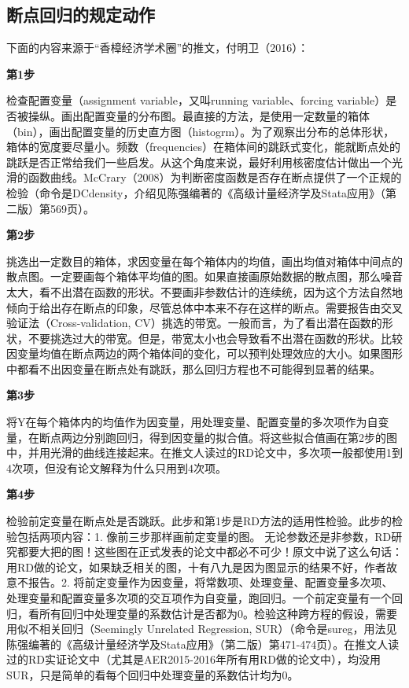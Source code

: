 \documentclass[cn,12pt,math=newtx,citestyle=gb7714-2015,bibstyle=gb7714-2015]{elegantbook}
\begin{document}
	\subsection{断点回归的规定动作}
	
	下面的内容来源于“香樟经济学术圈”的推文，付明卫（2016）：
	
	\textbf{第1步}
	
	检查配置变量（assignment variable，又叫running variable、forcing variable）是否被操纵。画出配置变量的分布图。最直接的方法，是使用一定数量的箱体（bin），画出配置变量的历史直方图（histogrm）。为了观察出分布的总体形状，箱体的宽度要尽量小。频数（frequencies）在箱体间的跳跃式变化，能就断点处的跳跃是否正常给我们一些启发。从这个角度来说，最好利用核密度估计做出一个光滑的函数曲线。McCrary（2008）为判断密度函数是否存在断点提供了一个正规的检验（命令是DCdensity，介绍见陈强编著的《高级计量经济学及Stata应用》（第二版）第569页）。
	
	\textbf{第2步}
	
	挑选出一定数目的箱体，求因变量在每个箱体内的均值，画出均值对箱体中间点的散点图。一定要画每个箱体平均值的图。如果直接画原始数据的散点图，那么噪音太大，看不出潜在函数的形状。不要画非参数估计的连续统，因为这个方法自然地倾向于给出存在断点的印象，尽管总体中本来不存在这样的断点。需要报告由交叉验证法（Cross-validation, CV）挑选的带宽。一般而言，为了看出潜在函数的形状，不要挑选过大的带宽。但是，带宽太小也会导致看不出潜在函数的形状。比较因变量均值在断点两边的两个箱体间的变化，可以预判处理效应的大小。如果图形中都看不出因变量在断点处有跳跃，那么回归方程也不可能得到显著的结果。
	
	\textbf{第3步}
	
	将Y在每个箱体内的均值作为因变量，用处理变量、配置变量的多次项作为自变量，在断点两边分别跑回归，得到因变量的拟合值。将这些拟合值画在第2步的图中，并用光滑的曲线连接起来。在推文人读过的RD论文中，多次项一般都使用1到4次项，但没有论文解释为什么只用到4次项。
	
	\textbf{第4步}
	
	检验前定变量在断点处是否跳跃。此步和第1步是RD方法的适用性检验。此步的检验包括两项内容：1. 像前三步那样画前定变量的图。 无论参数还是非参数，RD研究都要大把的图！这些图在正式发表的论文中都必不可少！原文中说了这么句话：用RD做的论文，如果缺乏相关的图，十有八九是因为图显示的结果不好，作者故意不报告。2. 将前定变量作为因变量，将常数项、处理变量、配置变量多次项、处理变量和配置变量多次项的交互项作为自变量，跑回归。一个前定变量有一个回归，看所有回归中处理变量的系数估计是否都为0。检验这种跨方程的假设，需要用似不相关回归（Seemingly Unrelated Regression, SUR）（命令是sureg，用法见陈强编著的《高级计量经济学及Stata应用》（第二版）第471-474页）。在推文人读过的RD实证论文中（尤其是AER2015-2016年所有用RD做的论文中），均没用SUR，只是简单的看每个回归中处理变量的系数估计均为0。
	
\end{document}
